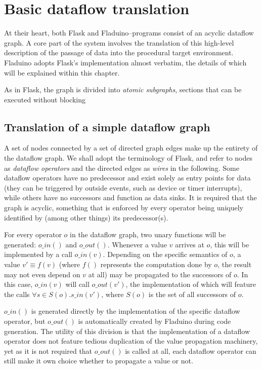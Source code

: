 \documentclass[a4paper,oneside, draft]{memoir}
\begin{document}
\section{Basic dataflow translation}

At their heart, both Flask and Fladuino--programs consist of an
acyclic dataflow graph.  A core part of the system involves the
translation of this high-level description of the passage of data into
the procedural target environment.  Fladuino adopts Flask's
implementation almost verbatim, the details of which will be explained
within this chapter.

As in Flask, the graph is divided into \textit{atomic subgraphs},
sections that can be executed without blocking

\subsection{Translation of a simple dataflow graph}

A set of nodes connected by a set of directed graph edges make up the
entirety of the dataflow graph.  We shall adopt the terminology of
Flask, and refer to nodes as \textit{dataflow operators} and the
directed edges as \textit{wires} in the following.  Some dataflow
operators have no predecessor and exist solely as entry points for
data (they can be triggered by outside events, such as device or timer
interrupts), while others have no successors and function as data
sinks.  It is required that the graph is acyclic, something that is
enforced by every operator being uniquely identified by (among other
things) its predecessor(s).

For every operator $o$ in the dataflow graph, two unary functions will
be generated: $o\_in()$ and $o\_out()$.  Whenever a value $v$ arrives
at $o$, this will be implemented by a call $o\_in(v)$.  Depending on
the specific semantics of $o$, a value $v'\equiv f(v)$ (where $f()$
represents the computation done by $o$, the result may not even depend
on $v$ at all) may be propagated to the successors of $o$.  In this
case, $o\_in(v)$ will call $o\_out(v')$, the implementation of which
will feature the calls $\forall s \in S(o). s\_in(v')$, where $S(o)$
is the set of all successors of $o$.

$o\_in()$ is generated directly by the implementation of the specific
dataflow operator, but $o\_out()$ is automatically created by Fladuino
during code generation.  The utility of this division is that the
implementation of a dataflow operator does not feature tedious
duplication of the value propagation machinery, yet as it is not
required that $o\_out()$ is called at all, each dataflow operator can
still make it own choice whether to propagate a value or not.
\end{document}
